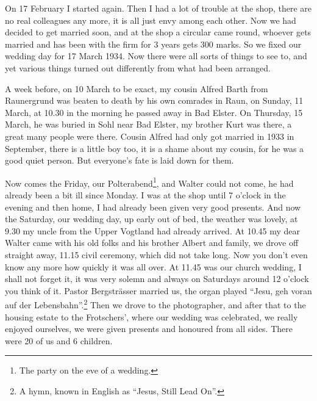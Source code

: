 \documentclass[a5paper,11pt,openany]{book}
\newcommand{\seite}[1]{\leavevmode\marginpar{\footnotesize\itshape\raggedright #1}\ignorespaces}
\begin{document}
\seite{28}
On 17 February I started again.
Then I had a lot of trouble at the shop, there are no real colleagues any more, it is all just envy among each other.
Now we had decided to get married soon,
  and at the shop a circular came round, whoever gets married and has been with the firm for 3 years gets 300 marks.
So we fixed our wedding day for 17 March 1934.
Now there were all sorts of things to see to, and yet various things turned out differently from what had been arranged.

\seite{29}
A week before, on 10 March to be exact, my cousin Alfred Barth from Raunergrund was beaten to death by his own comrades in Raun,
  on Sunday, 11 March, at 10.30 in the morning he passed away in Bad Elster.
On Thursday, 15 March, he was buried in Sohl near Bad Elster, my brother Kurt was there, a great many people were there.
Cousin Alfred had only got married in 1933 in September,
  there is a little boy too, it is a shame about my cousin, for he was a good quiet person.
But everyone's fate is laid down for them.

\seite{30}
Now comes the Friday, our Polterabend\footnote{The party on the eve of a wedding.}, and Walter could not come,
  he had already been a bit ill since Monday.
I was at the shop until 7 o'clock in the evening and then home,
  I had already been given very good presents.
And now the Saturday, our wedding day, up early out of bed,
  the weather was lovely, at 9.30 my uncle from the Upper Vogtland had already arrived.
At 10.45 my dear Walter came with his old folks and his brother Albert and family,
  we drove off straight away, 11.15 civil ceremony, which did not take long.
Now you
\seite{31}
don't even know any more how quickly it was all over.
At 11.45 was our church wedding, I shall not forget it,
  it was very solemn and always on Saturdays around 12 o'clock you think of it.
Pastor Bergsträsser married us, the organ played ``Jesu, geh voran auf der Lebensbahn''.\footnote{A hymn, known in English as ``Jesus, Still Lead On''.}
Then we drove to the photographer, and after that to the housing estate to the Frotschers', where our wedding was celebrated,
  we really enjoyed ourselves, we were given presents and honoured from all sides.
There were 20 of us and 6 children.
\end{document}

